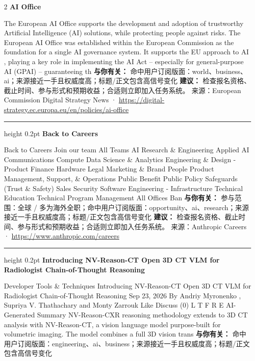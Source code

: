 \documentclass[10.5pt]{ctexart}
\begin{document}
\begin{multicols}{2}
{\large\bfseries AI Office}\par
The European AI Office supports the development and adoption of trustworthy Artificial Intelligence (AI) solutions, while protecting people against risks. The European AI Office was established within the European Commission as the foundation for a single AI governance system. It supports the EU approach to AI , playing a key role in implementing the AI Act – especially for general-purpose AI (GPAI) – guaranteeing th
\textbf{与你有关：} 命中用户订阅版面：world、business、ai；来源接近一手且权威度高；标题/正文包含高信号变化
\textbf{建议：} 检查报名资格、截止时间、参与形式和预期收益；合适则立即加入任务系统。
{\footnotesize\color{ormuted} 来源：European Commission Digital Strategy News · \url{https://digital-strategy.ec.europa.eu/en/policies/ai-office}}
\vspace{2mm}
\hrule height 0.2pt
\vspace{2mm}
{\large\bfseries Back to Careers}\par
Back to Careers Join our team All Teams AI Research \& Engineering Applied AI Communications Compute Data Science \& Analytics Engineering \& Design - Product Finance Hardware Legal Marketing \& Brand People Product Management, Support, \& Operations Public Benefit Public Policy Safeguards (Trust \& Safety) Sales Security Software Engineering - Infrastructure Technical Education Technical Program Management All Offices Ban
\textbf{与你有关：} 参与范围：全球 / 多为海外全职；命中用户订阅版面：opportunity、ai、research；来源接近一手且权威度高；标题/正文包含高信号变化
\textbf{建议：} 检查报名资格、截止时间、参与形式和预期收益；合适则立即加入任务系统。
{\footnotesize\color{ormuted} 来源：Anthropic Careers · \url{https://www.anthropic.com/careers}}
\vspace{2mm}
\hrule height 0.2pt
\vspace{2mm}
{\large\bfseries Introducing NV-Reason-CT Open 3D CT VLM for Radiologist Chain-of-Thought Reasoning}\par
Developer Tools \& Techniques Introducing NV-Reason-CT Open 3D CT VLM for Radiologist Chain-of-Thought Reasoning Sep 23, 2026 By Andriy Myronenko , Supriya V. Thathachary and Monty Zarrouk Like Discuss (0) L T F R E AI-Generated Summary NV-Reason-CXR reasoning methodology extends to 3D CT analysis with NV-Reason-CT, a vision language model purpose-built for volumetric imaging. The model combines a full 3D vision trans
\textbf{与你有关：} 命中用户订阅版面：engineering、ai、business；来源接近一手且权威度高；标题/正文包含高信号变化

\end{multicols}
\end{document}
